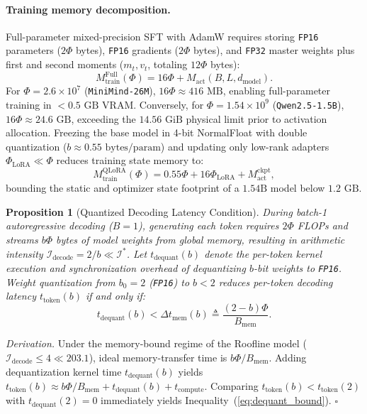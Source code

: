 \documentclass[10pt,a4paper,twocolumn]{article}
\newtheorem{proposition}{Proposition}
\begin{document}
\paragraph{Training memory decomposition.}
Full-parameter mixed-precision SFT with AdamW \citep{loshchilov2019decoupled} requires storing \texttt{FP16} parameters ($2\Phi$ bytes), \texttt{FP16} gradients ($2\Phi$ bytes), and \texttt{FP32} master weights plus first and second moments ($m_t, v_t$, totaling $12\Phi$ bytes):
\begin{equation}
  M_{\text{train}}^{\text{Full}}(\Phi) = 16\Phi + M_{\text{act}}(B, L, d_{\text{model}}).
  \label{eq:mem_full}
\end{equation}
For $\Phi = 2.6 \times 10^7$ (\texttt{MiniMind-26M}), $16\Phi \approx 416\text{ MB}$, enabling full-parameter training in $<0.5\text{ GB}$ VRAM. Conversely, for $\Phi = 1.54 \times 10^9$ (\texttt{Qwen2.5-1.5B}), $16\Phi \approx 24.6\text{ GB}$, exceeding the $14.56\text{ GiB}$ physical limit prior to activation allocation. Freezing the base model in 4-bit NormalFloat with double quantization ($b \approx 0.55\text{ bytes/param}$) and updating only low-rank adapters $\Phi_{\text{LoRA}} \ll \Phi$ \citep{dettmers2023qlora} reduces training state memory to:
\begin{equation}
  M_{\text{train}}^{\text{QLoRA}}(\Phi) = 0.55\Phi + 16\Phi_{\text{LoRA}} + M_{\text{act}}^{\text{ckpt}},
  \label{eq:mem_qlora}
\end{equation}
bounding the static and optimizer state footprint of a $1.54\text{B}$ model below $1.2\text{ GB}$.

\begin{proposition}[Quantized Decoding Latency Condition]
\label{prop:quant}
During batch-1 autoregressive decoding ($B=1$), generating each token requires $2\Phi$ FLOPs and streams $b\Phi$ bytes of model weights from global memory, resulting in arithmetic intensity $\mathcal{I}_{\text{decode}} = 2/b \ll \mathcal{I}^*$. Let $t_{\text{dequant}}(b)$ denote the per-token kernel execution and synchronization overhead of dequantizing $b$-bit weights to \texttt{FP16}. Weight quantization from $b_0=2$ (\texttt{FP16}) to $b < 2$ reduces per-token decoding latency $t_{\text{token}}(b)$ if and only if:
\begin{equation}
  t_{\text{dequant}}(b) < \Delta t_{\text{mem}}(b) \triangleq \frac{(2 - b)\Phi}{B_{\text{mem}}}.
  \label{eq:dequant_bound}
\end{equation}
\end{proposition}
\noindent\textit{Derivation.} Under the memory-bound regime of the Roofline model ($\mathcal{I}_{\text{decode}} \le 4 \ll 203.1$), ideal memory-transfer time is $b\Phi / B_{\text{mem}}$. Adding dequantization kernel time $t_{\text{dequant}}(b)$ yields $t_{\text{token}}(b) \approx b\Phi / B_{\text{mem}} + t_{\text{dequant}}(b) + t_{\text{compute}}$. Comparing $t_{\text{token}}(b) < t_{\text{token}}(2)$ with $t_{\text{dequant}}(2) = 0$ immediately yields Inequality~(\ref{eq:dequant_bound}). $\square$
\end{document}
